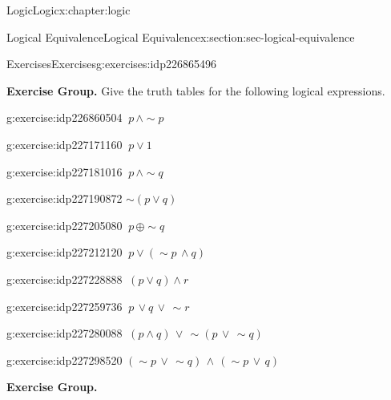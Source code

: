 \documentclass[twoside,10pt,]{book}
\numberwithin{equation}{section}
\begin{document}
\begin{chapterptx}{Logic}{}{Logic}{}{}{x:chapter:logic}
\begin{sectionptx}{Logical Equivalence}{}{Logical Equivalence}{}{}{x:section:sec-logical-equivalence}
\typeout{************************************************}
%
\begin{exercises-subsection}{Exercises}{}{Exercises}{}{}{g:exercises:idp226865496}
\par\medskip\noindent%
\textbf{Exercise Group.}\space\space%
Give the truth tables for the following logical expressions.\begin{exercisegroup}
\begin{divisionexerciseeg}{1}{}{}{g:exercise:idp226860504}%
\(\ p\,{\wedge}\sim\!{p}\)\end{divisionexerciseeg}%
\begin{divisionexerciseeg}{2}{}{}{g:exercise:idp227171160}%
\(\ p{\vee} 1\)\end{divisionexerciseeg}%
\begin{divisionexerciseeg}{3}{}{}{g:exercise:idp227181016}%
\(\ p\,{\wedge}\sim\!{q}\)\end{divisionexerciseeg}%
\begin{divisionexerciseeg}{4}{}{}{g:exercise:idp227190872}%
\(\sim\!(p{\vee} q)\)\end{divisionexerciseeg}%
\begin{divisionexerciseeg}{5}{}{}{g:exercise:idp227205080}%
\(\ p\,{\oplus}\sim\!{q}\)\end{divisionexerciseeg}%
\begin{divisionexerciseeg}{6}{}{}{g:exercise:idp227212120}%
\(\ p{\vee}(\sim\!{p}\,{\wedge} q)\)\end{divisionexerciseeg}%
\begin{divisionexerciseeg}{7}{}{}{g:exercise:idp227228888}%
\(\ (p{\vee} q){\wedge} r\)\end{divisionexerciseeg}%
\begin{divisionexerciseeg}{8}{}{}{g:exercise:idp227259736}%
\(\ p\,{\vee} q\,{\vee}\, \sim\!{r}\)\end{divisionexerciseeg}%
\begin{divisionexerciseeg}{9}{}{}{g:exercise:idp227280088}%
\(\ (p{\wedge} q)\,{\vee}\,\sim\!(p\,{\vee}\,\sim\!{q})\)\end{divisionexerciseeg}%
\begin{divisionexerciseeg}{10}{}{}{g:exercise:idp227298520}%
\((\sim\!{p}\,{\vee}\,\sim\!{q})\,{\wedge}\,(\sim\!{p}\,{\vee}\,q)\)\end{divisionexerciseeg}%
\end{exercisegroup}
\par\medskip\noindent
\par\medskip\noindent%
\textbf{Exercise Group.}\space\space%

\end{exercises-subsection}
\end{sectionptx}
\end{chapterptx}
\end{document}
